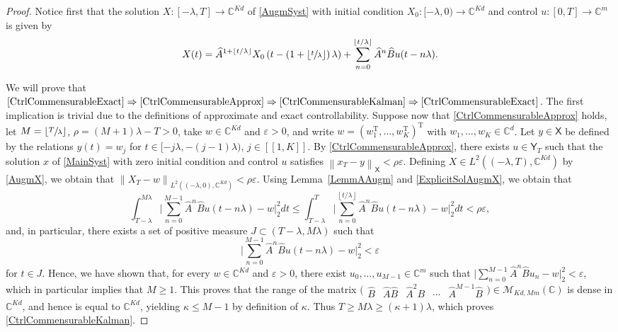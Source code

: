 \documentclass[10pt]{amsart}
\newcommand\implique{\mathchoice{\Longrightarrow}{\Rightarrow}{\Rightarrow}{\Rightarrow}}
\newcommand{\llbracket}{[\![}
\newcommand{\rrbracket}{]\!]}
\theoremstyle{plain}
\theoremstyle{definition}
\newcommand{\transp}{{\scriptscriptstyle\mathrm{T}}}
\newcommand{\norm}[1]{\left\lVert #1\right\lVert}
\newcommand{\floor}[1]{\left\lfloor #1 \right\rfloor}
\newcommand{\babs}[1]{\bigl\lvert #1\bigr \rvert}
\newcommand{\bgabs}[1]{\biggl\lvert #1\biggr \rvert}
\begin{document}
\begin{proof}
Notice first that the solution $X: [-\lambda, T] \to \mathbb C^{Kd}$ of \eqref{AugmSyst} with initial condition $X_0: [-\lambda, 0) \to \mathbb C^{Kd}$ and control $u: [0, T] \to \mathbb C^m$ is given by
\begin{equation}
\label{ExplicitSolAugmX}
X(t) = \widehat A^{1 + \floor{t/\lambda}} X_0\left(t - \left(1 + \floor{\sfrac{t}{\lambda}}\right) \lambda\right) + \sum_{n=0}^{\floor{t/\lambda}} \widehat A^n \widehat B u(t - n\lambda).
\end{equation}

We will prove that $\eqref{CtrlCommensurableExact}\implique \eqref{CtrlCommensurableApprox}\implique \eqref{CtrlCommensurableKalman}\implique\eqref{CtrlCommensurableExact}$. The first implication is trivial due to the definitions of approximate and exact controllability. Suppose now that \eqref{CtrlCommensurableApprox} holds, let $M = \floor{\sfrac{T}{\lambda}}$, $\rho = (M+1)\lambda - T > 0$, take $w \in \mathbb C^{Kd}$ and $\varepsilon > 0$, and write $w = \left(w_1^\transp, \dots, w_K^\transp\right)^\transp$ with $w_1, \dots, w_K \in \mathbb C^d$. Let $y \in \mathsf X$ be defined by the relations $y(t) = w_j$ for $t \in [-j\lambda, -(j-1)\lambda)$, $j \in \llbracket 1, K\rrbracket$. By \eqref{CtrlCommensurableApprox}, there exists $u \in \mathsf Y_T$ such that the solution $x$ of \eqref{MainSyst} with zero initial condition and control $u$ satisfies $\norm{x_T - y}_{\mathsf X} < \rho\varepsilon$. Defining $X \in L^2((-\lambda, T), \mathbb C^{Kd})$ by \eqref{AugmX}, we obtain that $\norm{X_T - w}_{L^2((-\lambda, 0), \mathbb C^{Kd})} < \rho\varepsilon$. Using Lemma~\ref{LemmAAugm} and \eqref{ExplicitSolAugmX}, we obtain that
\[
\int_{T - \lambda}^{M\lambda} \bgabs{\sum_{n=0}^{M-1} \widehat A^n \widehat B u(t - n\lambda) - w}_{2}^2 dt \leq \int_{T - \lambda}^T \bgabs{\sum_{n=0}^{\floor{t/\lambda}} \widehat A^n \widehat B u(t - n\lambda) - w}_{2}^2 dt < \rho\varepsilon,
\]
and, in particular, there exists a set of positive measure $J \subset (T - \lambda, M\lambda)$ such that
\[
\bgabs{\sum_{n=0}^{M-1} \widehat A^n \widehat B u(t - n\lambda) - w}_{2}^2 < \varepsilon
\]
for $t \in J$. Hence, we have shown that, for every $w \in \mathbb C^{K d}$ and $\varepsilon > 0$, there exist $u_0, \dots, u_{M-1} \in \mathbb C^m$ such that $\babs{\sum_{n=0}^{M-1} \widehat A^n \widehat B u_n - w}_2^2 < \varepsilon$, which in particular implies that $M \geq 1$. This proves that the range of the matrix $\bigl(\begin{matrix}\widehat B & \widehat A \widehat B & \widehat A^2 B & \cdots & \widehat A^{M-1} \widehat B\end{matrix}\bigr) \in \mathcal M_{Kd, M m}(\mathbb C)$ is dense in $\mathbb C^{Kd}$, and hence is equal to $\mathbb C^{Kd}$, yielding $\kappa \leq M - 1$ by definition of $\kappa$. Thus $T \geq M \lambda \geq (\kappa + 1)\lambda$, which proves \eqref{CtrlCommensurableKalman}.


\end{proof}
\end{document}
